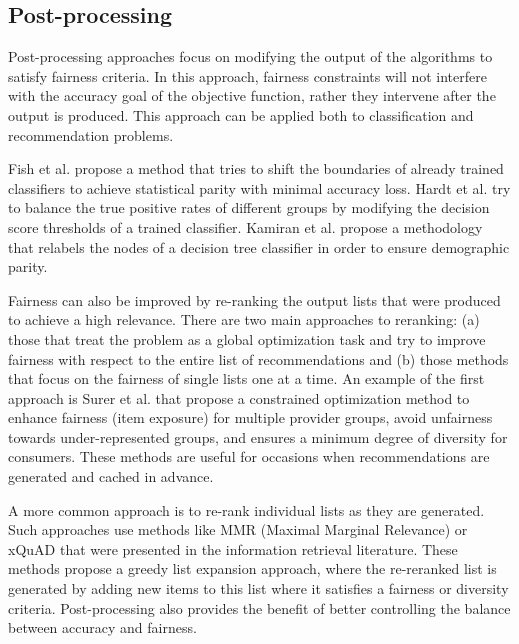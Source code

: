     \subsection{Post-processing}

        Post-processing approaches focus on modifying the output of the algorithms to satisfy fairness criteria. In this approach, fairness constraints will not interfere with the accuracy goal of the objective function, rather they intervene after the output is produced. This approach can be applied both to classification and recommendation problems.
        
        Fish et al. \cite{fish2016confidence} propose a method that tries to shift the boundaries of already trained classifiers to achieve statistical parity with minimal accuracy loss. Hardt et al. \cite{hardt2016equality} try to balance the true positive rates of different groups by modifying the decision score thresholds of a trained classifier. Kamiran et al. \cite{kamiran2010discrimination} propose a methodology that relabels the nodes of a decision tree classifier in order to ensure demographic parity.

        Fairness can also be improved by re-ranking the output lists that were produced to achieve a high relevance. There are two main approaches to reranking: (a) those that treat the problem as a global optimization task and try to improve fairness with respect to the entire list of recommendations and (b) those methods that focus on the fairness of single lists one at a time. An example of the first approach is Surer et al. \cite{surer2018multistakeholder} that propose a constrained optimization method to enhance fairness (item exposure) for multiple provider groups, avoid unfairness towards under-represented groups, and ensures a minimum degree of diversity for consumers. These methods are useful for occasions when recommendations are generated and cached in advance.

        A more common approach is to re-rank individual lists as they are generated. Such approaches use methods like MMR (Maximal Marginal Relevance) \cite{carbonell1998use} or xQuAD \cite{santos2010explicit} that were presented in the information retrieval literature. These methods propose a greedy list expansion approach, where the re-reranked list is generated by adding new items to this list where it satisfies a fairness or diversity criteria. Post-processing also provides the benefit of better controlling the balance between accuracy and fairness. 
        
